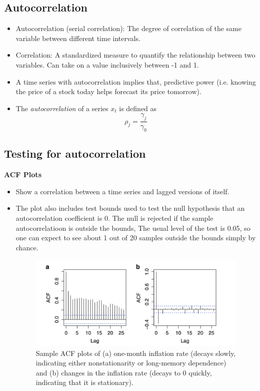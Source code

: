 \documentclass[11pt]{article}
\begin{document}
\subsection{Autocorrelation}
\begin{itemize}
    \item Autocorrelation (serial correlation): The degree of correlation of the same variable 
    between different time intervals.
    \item Correlation: A standardized measure to quantify the relationship between two 
    variables. Can take on a value inclusively between -1 and 1.
    \item A time series with autocorrelation implies that, predictive power (i.e. knowing the
    price of a stock today helps forecast its price tomorrow).
    \item The \textit{autocorrelation} of a series $x_t$ is defined as 
    \[\rho_j = \frac{\gamma_j}{\gamma_0}\]
\end{itemize}

\subsection{Testing for autocorrelation}
\textbf{ACF Plots}
\begin{itemize}
    \item Show a correlation between a time series and lagged versions of itself. 
    \item The plot also includes test bounds used to test the null hypothesis that an 
    autocorrelation coefficient is 0. The null is rejected if the sample autocorrelatioon is
    outside the bounds, The usual level of the test is 0.05, so one can expect to see about 1
    out of 20 samples outside the bounds simply by chance. 

    \begin{figure}[H] 
        \centering 
        \includegraphics[width=5in]{imgs/acf_plots.png}
        \caption{Sample ACF plots of (a) one-month inflation rate (decays slowly, indicating 
        either nonstationarity or long-memory dependence) and (b) changes in the inflation rate
        (decays to 0 quickly, indicating that it is stationary).}
    \end{figure}

\end{itemize}
\end{document}
